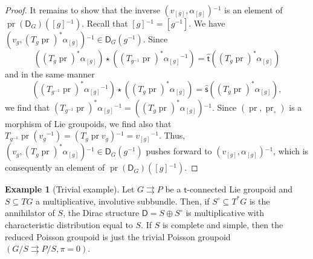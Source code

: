 \documentclass{amsart}
\theoremstyle{definition}
\newtheorem{example}[theorem]{Example}
\begin{document}
\begin{proof}
It remains to show that the inverse $(v_{[g]},\alpha_{[g]}){^{-1}}$
is an element of $\operatorname{pr}(\mathsf D_G)([g]{^{-1}})$. Recall
that $[g]{^{-1}}=[g{^{-1}}]$. We have 
$(v_g,(T_g\operatorname{pr})^* \alpha_{[g]}){^{-1}}\in\mathsf D_G(g{^{-1}})$.
Since 
\[\left((T_g\operatorname{pr})^* \alpha_{[g]}\right)\star \left((T_{g{^{-1}}}\operatorname{pr})^*\alpha_{[g]}{^{-1}}\right)
=\hat{{\mathsf{t}}}((T_g\operatorname{pr})^* \alpha_{[g]})\]
and 
in the same manner
\[\left((T_{g{^{-1}}}\operatorname{pr})^*\alpha_{[g]}{^{-1}}\right)\star \left((T_g\operatorname{pr})^* \alpha_{[g]}\right)
=\hat{{\mathsf{s}}}((T_g\operatorname{pr})^* \alpha_{[g]}),\] we find that 
$(T_{g{^{-1}}}\operatorname{pr})^*\alpha_{[g]}{^{-1}}=((T_g\operatorname{pr})^* \alpha_{[g]}){^{-1}}$.
Since $(\operatorname{pr},\operatorname{pr}_\circ)$ is a morphism of Lie groupoids, we find also
that $T_{g{^{-1}}}\operatorname{pr} (v_g{^{-1}})=(T_g\operatorname{pr} v_g){^{-1}}=v_{[g]}{^{-1}}$.
Thus,\linebreak $(v_g,(T_g\operatorname{pr})^* \alpha_{[g]}){^{-1}}\in\mathsf D_G(g{^{-1}})$
pushes forward to $(v_{[g]},\alpha_{[g]}){^{-1}}$, which is consequently
an element of $\operatorname{pr}(\mathsf D_G)([g]{^{-1}})$.
\end{proof}

\begin{example}[Trivial example]
Let $G{{\rightrightarrows}} P$ be a ${{\mathsf{t}}}$-connected Lie groupoid and 
 $S\subseteq TG$ a  multiplicative, involutive 
subbundle. Then, if $S^\circ \subseteq T^*G$ is the annihilator
of $S$, the  Dirac structure $\mathsf D=S\oplus S^\circ$
is multiplicative with characteristic distribution equal to $S$. 
If $S$ is complete and simple, then the reduced 
Poisson groupoid is just the trivial Poisson groupoid $(G/S{{\rightrightarrows}} P/S, \pi=0)$.
\end{example}
\end{document}
